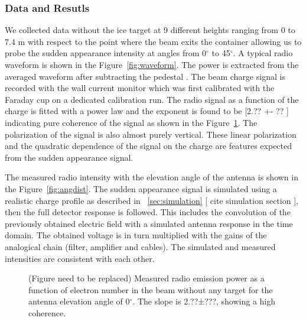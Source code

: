\documentclass[12pt]{article}
\begin{document}
\subsubsection{Data and Resutls}
We collected data without the ice target at 9 different heights ranging from 0 to 7.4 m with respect to the point where the beam exits the container allowing us to probe the sudden appearance intensity at angles from 0$^{\circ}$ to 45$^{\circ}$. A typical radio waveform is shown in the Figure~\ref{fig:waveform}. 
The power is extracted from the averaged waveform after subtracting the pedestal . 
The beam charge signal is recorded with the wall current monitor which was first calibrated with the Faraday cup on a dedicated calibration run. 
The radio signal as a function of the charge is fitted with a power law and the exponent is found to be \color{red} [2.?? +- ?? ]\color{black} indicating pure coherence of the signal as shown in the Figure~\ref{fig:cohe}. 
The polarization of the signal is also almost purely vertical. 
These linear polarization and the quadratic dependence of the signal on the charge are features expected from the sudden appearance signal.

The measured radio intensity with the elevation angle of the antenna is shown in the Figure~\ref{fig:angdist}. The sudden appearance signal is simulated using a realistic charge profile as described in ~\ref{sec:simulation}\color{red} [ cite simulation section ]\color{black}, then
the full detector response is followed.
This includes the convolution of the previously obtained electric field  with a simulated antenna response in the time domain. The obtained voltage is in turn multiplied with the gains of the analogical chain (filter, amplifier and cables). The simulated and measured intensities are consistent with each other.

\begin{figure}[!h]
  \centering
  \hspace*{-3ex}
	\caption{ \color{red} (Figure need to be replaced) \color{black} 
	Measured radio emission power as a function of electron number in the beam
	without any target for the antenna elevation angle of 0$^{\circ}$. 
	The slope is 2.??±???, showing a high coherence.	}
  \label{fig:cohe}
\end{figure}
\end{document}
